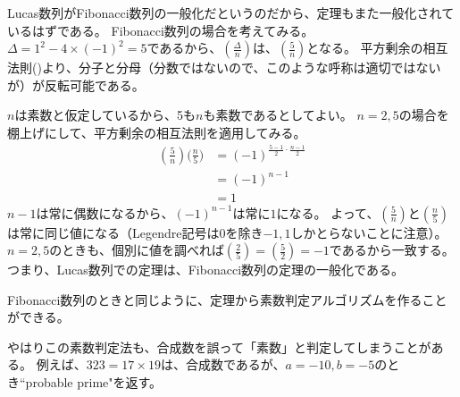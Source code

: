 Lucas数列がFibonacci数列の一般化だというのだから、定理もまた一般化されているはずである。
Fibonacci数列の場合を考えてみる。
$\Delta = 1^2-4\times(-1)^2=5$であるから、$\left(\frac{\Delta}{n}\right)$は、$\left(\frac{5}{n}\right)$となる。
平方剰余の相互法則()より、分子と分母（分数ではないので、このような呼称は適切ではないが）が反転可能である。

$n$は素数と仮定しているから、5も$n$も素数であるとしてよい。
$n=2, 5$の場合を棚上げにして、平方剰余の相互法則を適用してみる。
\begin{align*}
\left(\frac{5}{n}\right) \bigg(\frac{n}{5}\bigg) &= (-1)^{\frac{5-1}{2}\cdot\frac{n-1}{2}}\\
&= (-1)^{n-1}\\
&= 1
\end{align*}
$n-1$は常に偶数になるから、$(-1)^{n-1}$は常に$1$になる。
よって、$\left(\frac{5}{n}\right)$と$\left(\frac{n}{5}\right)$は常に同じ値になる（Legendre記号は$0$を除き$-1,1$しかとらないことに注意）。
$n=2, 5$のときも、個別に値を調べれば$\left(\frac{2}{5}\right) = \left(\frac{5}{2}\right) = -1$であるから一致する。
つまり、Lucas数列での定理は、Fibonacci数列の定理の一般化である。

Fibonacci数列のときと同じように、定理から素数判定アルゴリズムを作ることができる。


やはりこの素数判定法も、合成数を誤って「素数」と判定してしまうことがある。
例えば、$323=17\times19$は、合成数であるが、$a=-10,b=-5$のとき``probable prime"を返す。

